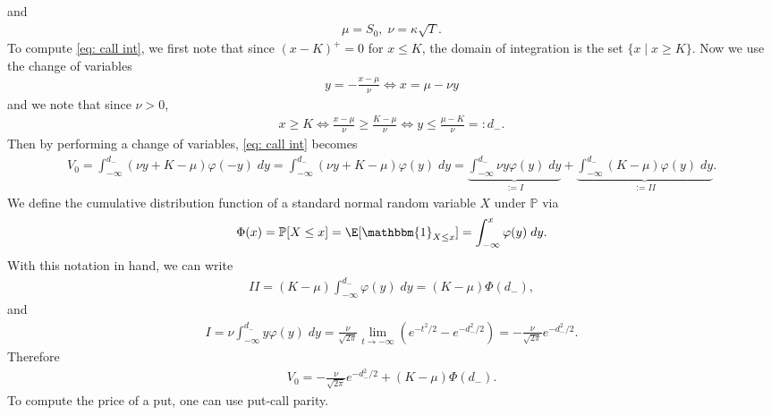 and
\begin{align}
	 \mu = S_0, \; \nu = \kappa \sqrt{T}.
\end{align}
To compute \eqref{eq: call int}, we first note that since $(x-K)^+ = 0$ for $x \le K$, the domain of integration is the set $\{x \mid x \ge K\}$. Now we use the change of variables 
\begin{align}
	 y = -\frac{x-\mu}{\nu} \Longleftrightarrow x = \mu - \nu y
\end{align}
and we note that since $\nu > 0$, 
\begin{align}
	 x \ge K \Longleftrightarrow \frac{x-\mu}{\nu} \ge \frac{K - \mu}{\nu} \Longleftrightarrow y \le \frac{\mu - K}{\nu} =: d_-.
\end{align}
Then by performing a change of variables, \eqref{eq: call int} becomes 
\begin{align}
	 V_0 = \int_{-\infty}^{d_-} (\nu y + K - \mu) \varphi(-y) \; dy = \int_{-\infty}^{d_-} (\nu y + K - \mu) \varphi(y) \; dy = \underbrace{\int_{-\infty}^{d_-} \nu y \varphi(y) \; dy}_{:= I} + \underbrace{\int_{-\infty}^{d_-}  (K-\mu)\varphi(y) \; dy}_{:= II}.
\end{align}
We define the cumulative distribution function of a standard normal random variable $X$ under $\mathbb{P}$ via 
\begin{align}
	 \Phi(x) = \mathbb{P}[X \le x] = \E[ \mathbbm{1}_{X \le x}] = \int_{-\infty}^x \varphi(y) \; dy.
\end{align}
With this notation in hand, we can write 
\begin{align}
	 II = (K-\mu) \int_{-\infty}^{d_-} \varphi(y) \; dy = (K-\mu) \Phi(d_-),
\end{align}
and 
\begin{align}
	 I = \nu \int_{-\infty}^{d_-} y \varphi(y) \; dy =  \frac{\nu}{\sqrt{2\pi}} \lim_{t \to -\infty} (e^{-t^2/2} - e^{-d_-^2/2}) = -\frac{\nu}{\sqrt{2\pi}} e^{-d_-^2/2}.
\end{align}
Therefore 
\begin{align}
	 V_0 =  -\frac{\nu}{\sqrt{2\pi}} e^{-d_-^2/2} + (K-\mu) \Phi(d_-).
\end{align}
To compute the price of a put, one can use put-call parity. 
